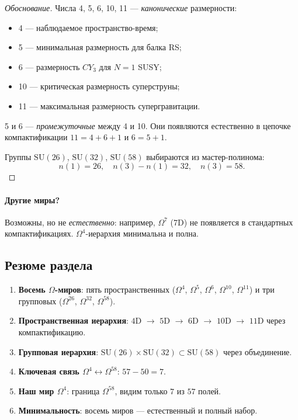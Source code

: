 \documentclass[11pt,a4paper]{article}
\newcommand{\SU}{\mathrm{SU}}
\newcommand{\CY}{CY_3}
\newcommand{\Om}{\Omega^4}
\newcommand{\Omf}{\Omega^5}
\newcommand{\Oms}{\Omega^6}
\newcommand{\Omt}{\Omega^{10}}
\newcommand{\Ome}{\Omega^{11}}
\newcommand{\Omtw}{\Omega^{26}}
\newcommand{\Omth}{\Omega^{32}}
\newcommand{\Omfi}{\Omega^{58}}
\theoremstyle{definition}
\begin{document}
\begin{proof}[Обоснование]
Числа 4, 5, 6, 10, 11 — \emph{канонические} размерности:
\begin{itemize}
    \item 4 — наблюдаемое пространство-время;
    \item 5 — минимальная размерность для балка RS;
    \item 6 — размерность $\CY$ для $N = 1$ SUSY;
    \item 10 — критическая размерность суперструны;
    \item 11 — максимальная размерность супергравитации.
\end{itemize}
5 и 6 — \emph{промежуточные} между 4 и 10. Они появляются 
естественно в цепочке компактификации $11 = 4 + 6 + 1$ 
и $6 = 5 + 1$.

Группы $\SU(26)$, $\SU(32)$, $\SU(58)$ выбираются из 
мастер-полинома:
\begin{equation}
    n(1) = 26, \quad n(3) - n(1) = 32, \quad n(3) = 58.
\end{equation}
\end{proof}

\paragraph{Другие миры?} 
Возможны, но не \emph{естественно}: например, $\Omega^7$ (7D) 
не появляется в стандартных компактификациях. $\Om$-иерархия 
минимальна и полна.

\subsection{Резюме раздела}
\label{subsec:worlds-summary}

\begin{enumerate}
    \item \textbf{Восемь $\Omega$-миров}: пять пространственных 
          ($\Om$, $\Omf$, $\Oms$, $\Omt$, $\Ome$) и три 
          групповых ($\Omtw$, $\Omth$, $\Omfi$).
    \item \textbf{Пространственная иерархия}: 
          $4$D $\to$ $5$D $\to$ $6$D $\to$ $10$D $\to$ $11$D 
          через компактификацию.
    \item \textbf{Групповая иерархия}: 
          $\SU(26) \times \SU(32) \subset \SU(58)$ через 
          объединение.
    \item \textbf{Ключевая связь $\Om \leftrightarrow \Omfi$}: 
          $57 - 50 = 7$.
    \item \textbf{Наш мир $\Om$}: граница $\Omfi$, видим только 
          $7$ из $57$ полей.
    \item \textbf{Минимальность}: восемь миров — естественный 
          и полный набор.
\end{enumerate}
\end{document}
